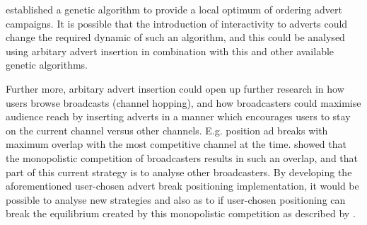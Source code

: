 	\citet{fleming2007optimal} established a genetic algorithm to provide a local optimum of ordering advert campaigns. It is possible that the introduction of interactivity to adverts could change the required dynamic of such an algorithm, and this could be analysed using arbitary advert insertion in combination with this and other available genetic algorithms.

	Further more, arbitary advert insertion could open up further research in how users browse broadcasts (channel hopping), and how broadcasters could maximise audience reach by inserting adverts in a manner which encourages users to stay on the current channel versus other channels. E.g. position ad breaks with maximum overlap with the most competitive channel at the time. \citet{epstein1998network} showed that the monopolistic competition of broadcasters results in such an overlap, and that part of this current strategy is to analyse other broadcasters. By developing the aforementioned user-chosen advert break positioning implementation, it would be possible to analyse new strategies and also as to if user-chosen positioning can break the equilibrium created by this monopolistic competition as described by \citeauthor{epstein1998network}.





